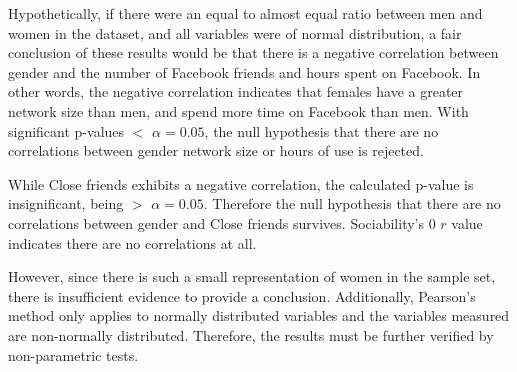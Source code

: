 \newpage
Hypothetically, if there were an equal to almost equal ratio between men and women in the dataset, and all variables were of normal distribution, a fair conclusion of these results would be that there is a negative correlation between gender and the number of Facebook friends and hours spent on Facebook. In other words, the negative correlation indicates that females have a greater network size than men, and spend more time on Facebook than men. With significant p-values $<$ $\alpha = 0.05$, the null hypothesis that there are no correlations between gender network size or hours of use is rejected. 

While Close friends exhibits a negative correlation, the calculated p-value is insignificant, being $>$ $\alpha = 0.05$. Therefore the null hypothesis that there are no correlations between gender and Close friends survives. Sociability's 0 $r$ value indicates there are no correlations at all.

However, since there is such a small representation of women in the sample set, there is insufficient evidence to provide a conclusion. Additionally, Pearson's method only applies to normally distributed variables and the variables measured are non-normally distributed. Therefore, the results must be further verified by non-parametric tests.

